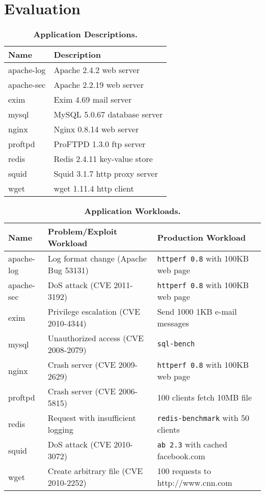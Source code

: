 \section{Evaluation}
\label{dora:sec:results}


\begin{table}[t]
\centering
\begin{tabular}{ll}
  \toprule
{\bf Name}     & {\bf Description}             \\ \midrule
		apache-log & Apache 2.4.2 web server       \\
		apache-sec & Apache 2.2.19 web server      \\
		exim       & Exim 4.69 mail server         \\
		mysql      & MySQL 5.0.67 database server  \\
		nginx      & Nginx 0.8.14 web server       \\
		proftpd    & ProFTPD 1.3.0 ftp server      \\
		redis      & Redis 2.4.11 key-value store  \\
		squid      & Squid 3.1.7 http proxy server \\
		wget       & wget 1.11.4 http client       \\
  \bottomrule
\end{tabular}
\caption{{\bf Application Descriptions.}}
\label{dora:tab:applications}
\end{table}

\begin{table}[t]
\centering
\begin{tabular}{lll}
  \toprule
{\bf Name}     & {\bf Problem/Exploit Workload}        & {\bf Production Workload}             \\ \midrule
		apache-log & Log format change (Apache Bug 53131)  & {\tt httperf 0.8} with 100KB web page \\
		apache-sec & DoS attack (CVE 2011-3192)            & {\tt httperf 0.8} with 100KB web page \\
		exim       & Privilege escalation (CVE 2010-4344)  & Send 1000 1KB e-mail messages         \\
		mysql      & Unauthorized access (CVE 2008-2079)   & {\tt sql-bench}                       \\
		nginx      & Crash server (CVE 2009-2629)          & {\tt httperf 0.8} with 100KB web page \\
		proftpd    & Crash server (CVE 2006-5815)          & 100 clients fetch 10MB file           \\
		redis      & Request with insufficient logging     & {\tt redis-benchmark} with 50 clients \\
		squid      & DoS attack (CVE 2010-3072)            & {\tt ab 2.3} with cached facebook.com \\
		wget       & Create arbitrary file (CVE 2010-2252) & 100 requests to http://www.cnn.com    \\
  \bottomrule
\end{tabular}
\caption{{\bf Application Workloads.}}
\label{dora:tab:workloads}
\end{table}

